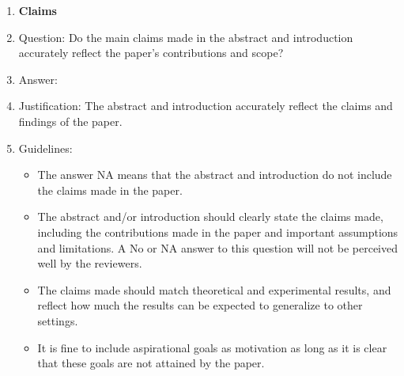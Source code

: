 \documentclass{article}
\begin{document}
\begin{enumerate}

\item {\bf Claims}
    \item[] Question: Do the main claims made in the abstract and introduction accurately reflect the paper's contributions and scope?
    \item[] Answer: \answerYes{} %
    \item[] Justification:  The abstract and introduction accurately reflect the claims and findings of the paper.
    \item[] Guidelines:
    \begin{itemize}
        \item The answer NA means that the abstract and introduction do not include the claims made in the paper.
        \item The abstract and/or introduction should clearly state the claims made, including the contributions made in the paper and important assumptions and limitations. A No or NA answer to this question will not be perceived well by the reviewers. 
        \item The claims made should match theoretical and experimental results, and reflect how much the results can be expected to generalize to other settings. 
        \item It is fine to include aspirational goals as motivation as long as it is clear that these goals are not attained by the paper. 
    \end{itemize}


\end{enumerate}
\end{document}
